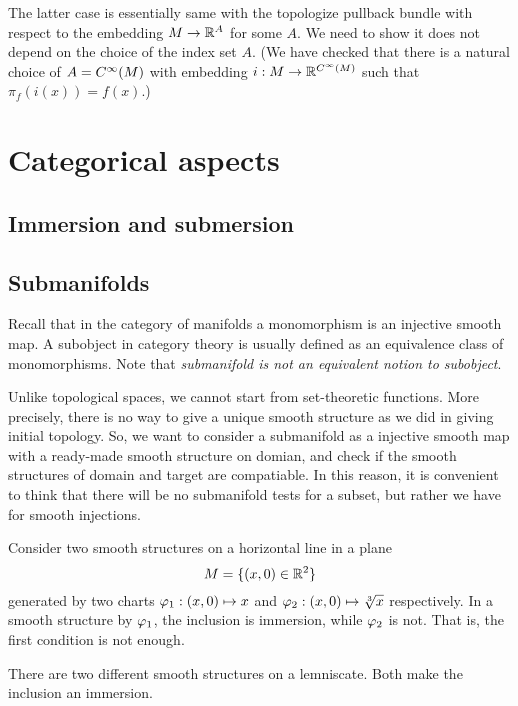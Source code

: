 \documentclass{../exp}
\begin{document}
The latter case is essentially same with the topologize pullback bundle with respect to the embedding $M\to\R^A$ for some $A$.
We need to show it does not depend on the choice of the index set $A$.
(We have checked that there is a natural choice of $A=C^\infty(M)$ with embedding $i:M\to\R^{C^\oo(M)}$ such that $\pi_f(i(x))=f(x)$.)










\section{Categorical aspects}

\subsection{Immersion and submersion}

\subsection{Submanifolds}

Recall that in the category of manifolds a monomorphism is an injective smooth map.
A subobject in category theory is usually defined as an equivalence class of monomorphisms.
Note that \emph{submanifold is not an equivalent notion to subobject}.





Unlike topological spaces, we cannot start from set-theoretic functions.
More precisely, there is no way to give a unique smooth structure as we did in giving initial topology.
So, we want to consider a submanifold as a injective smooth map with a ready-made smooth structure on domian, and check if the smooth structures of domain and target are compatiable.
In this reason, it is convenient to think that there will be no submanifold tests for a subset, but rather we have for smooth injections.
\begin{ex}
Consider two smooth structures on a horizontal line in a plane
\[M=\{(x,0)\in\mathbb{R}^2\}\]
generated by two charts $\varphi_1:(x,0)\mapsto x$ and $\varphi_2:(x,0)\mapsto\sqrt[3]{x}$ respectively.
In a smooth structure by $\varphi_1$, the inclusion is immersion, while $\varphi_2$ is not.
That is, the first condition is not enough.
\end{ex}
\begin{ex}
There are two different smooth structures on a lemniscate.
Both make the inclusion an immersion.
\end{ex}
\end{document}
